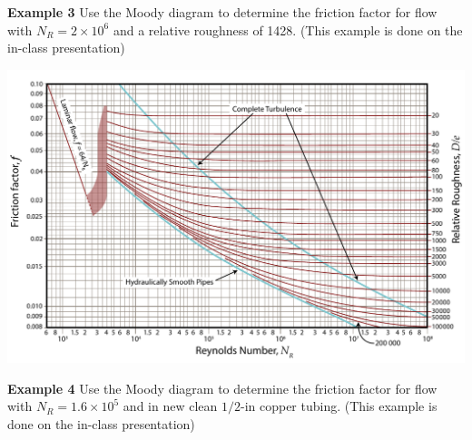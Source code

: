 \documentclass[10pt, onesided]{amsart}
\begin{document}
	\newpage
	
	
	
	\newpage
	
	
	\raggedright
	\textbf{Example 3}
	Use the Moody diagram to determine the friction factor for flow with $N_R=2\times 10^6$ and a relative roughness of
	1428.
	\parb
	(This example is done on the in-class presentation)
	\begin{center}
		\includegraphics[scale=1.05, angle=90]{../../figs/05FrictionLosses/moody.pdf}
	\end{center}
	
	
	\newpage
	
	
	\textbf{Example 4}
	Use the Moody diagram to determine the friction factor for flow with $N_R=1.6\times 10^5$ and in new clean
	$1/2$-in copper tubing.
	\parb
	(This example is done on the in-class presentation)
	
\end{document}

